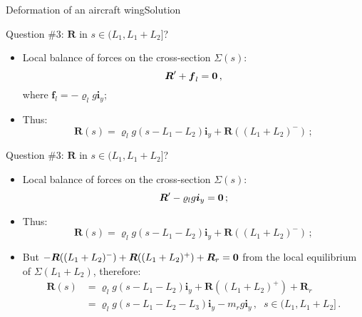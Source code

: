 \documentclass{beamer}
\newcommand{\yj}{y}
\renewcommand{\ij}{i}
\newcommand{\iv}{{\boldsymbol\ij}}
\newcommand{\fj}{f}
\newcommand{\fv}{{\boldsymbol\fj}}
\newcommand{\roi}{\varrho}
\newcommand{\Fresj}{R}
\newcommand{\Fres}{{\boldsymbol\Fresj}}
\newcommand{\bzero}{{\bf 0}}
\begin{document}
\begin{frame}{Deformation of an aircraft wing}{Solution}

\begin{overprint}

\vskip-20pt
\begin{exampleblock}{Question \#3: $\Fres$ in $s\in(L_1,L_1+L_2]$?}
\begin{itemize}
\item Local balance of forces on the cross-section $\Sigma(s)$:
\begin{displaymath}
\Fres'+\fv_l=\bzero\,,
\end{displaymath}
where $\fv_l=-\roi_l g\iv_\yj$;
\item Thus:
\begin{displaymath}
\Fres(s)=\roi_l g(s-L_1-L_2)\iv_\yj +\Fres((L_1+L_2)^-)\,;
\end{displaymath}
\end{itemize}
\end{exampleblock}

\vskip-20pt
\begin{exampleblock}{Question \#3: $\Fres$ in $s\in(L_1,L_1+L_2]$?}
\begin{itemize}
\item Local balance of forces on the cross-section $\Sigma(s)$:
\begin{displaymath}
\Fres'-\roi_l g\iv_\yj=\bzero\,;
\end{displaymath}
\item Thus:
\begin{displaymath}
\Fres(s)=\roi_l g(s-L_1-L_2)\iv_\yj +\Fres((L_1+L_2)^-)\,;
\end{displaymath}
\item But $-\Fres((L_1+L_2)^-)+\Fres((L_1+L_2)^+)+\Fres_r=\bzero$ from the local equilibrium of $\Sigma(L_1+L_2)$, therefore:
\begin{displaymath}
\begin{split}
\!\!\!\!\!\!\!\!\!\!\!\! \Fres(s) &=\roi_l g(s-L_1-L_2)\iv_\yj + \Fres((L_1+L_2)^+)+\Fres_r \\
\!\!\!\!\!\!\!\!\!\!\!\!  &=\roi_l g(s-L_1-L_2-L_3)\iv_\yj-m_r g\iv_\yj\,,\;\;s\in(L_1,L_1+L_2]\,.
\end{split}
\end{displaymath}
\end{itemize}
\end{exampleblock}


\end{overprint}
\end{frame}
\end{document}
